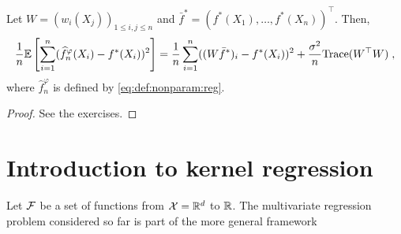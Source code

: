 \begin{shaded}
\begin{proposition}
Let  $W = (w_i(X_j))_{1\leqslant i,j \leqslant n}$ and $\bar f^* = (f^*(X_1),\ldots,f^*(X_n))^\top$. Then,
\[
\frac{1}{n}\mathbb{E}\left[\sum_{i=1}^n(\widehat f^\varphi_n(X_i) - f^*(X_i))^2\right] = \frac{1}{n}\sum_{i=1}^n((W\bar f^*)_i - f^*(X_i))^2 + \frac{\sigma^2}{n}\mathrm{Trace}(W^\top W)\;,
\]
where $\widehat f^\varphi_n$  is defined by \eqref{eq:def:nonparam:reg}.
\end{proposition}
\end{shaded}
\begin{proof}
See the exercises.
\end{proof}

\section{Introduction to kernel regression}
%
Let $\mathcal{F}$ be a set of functions from $\mathcal{X}=\mathbb{R}^d$ to $\mathbb{R}$. The multivariate regression problem considered so far is part of the more general framework
